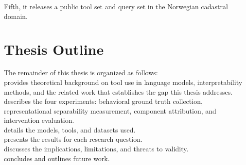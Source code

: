Fifth, it releases a public tool set and query set in the Norwegian cadastral domain.

\section{Thesis Outline}

The remainder of this thesis is organized as follows: \\

 provides theoretical background on tool use in language models, interpretability methods, and the related work that establishes the gap this thesis addresses. \\

 describes the four experiments: behavioral ground truth collection, representational separability measurement, component attribution, and intervention evaluation. \\

 details the models, tools, and datasets used. \\

 presents the results for each research question. \\

 discusses the implications, limitations, and threats to validity. \\

 concludes and outlines future work.
